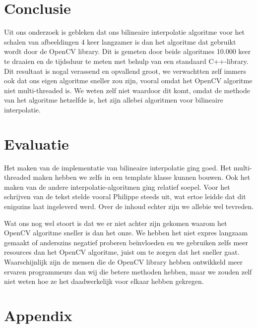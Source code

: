 \documentclass[a4paper]{article}
\begin{document}
\section{Conclusie}
\label{sec:org155c025}
Uit ons onderzoek is gebleken dat ons bilineaire interpolatie algoritme voor het schalen van afbeeldingen 4 keer langzamer is dan het algoritme dat gebruikt wordt door de OpenCV library. Dit is gemeten door beide algoritmes 10.000 keer te draaien en de tijdsduur te meten met behulp van een standaard C++-library. Dit resultaat is nogal verassend en opvallend groot, we verwachtten zelf immers ook dat ons eigen algoritme sneller zou zijn, vooral omdat het OpenCV algoritme niet multi-threaded is. We weten zelf niet waardoor dit komt, omdat de methode van het algoritme hetzelfde is, het zijn allebei algoritmen voor bilineaire interpolatie.

\section{Evaluatie}
\label{sec:orge75f9e9}
Het maken van de implementatie van bilineaire interpolatie ging goed. Het multi-threaded maken hebben we zelfs in een template klasse kunnen bouwen. Ook het maken van de andere interpolatie-algoritmen ging relatief soepel. Voor het schrijven van de tekst stelde vooral Philippe steeds uit, wat ertoe leidde dat dit enigszins laat ingeleverd werd. Over de inhoud echter zijn we allebie wel tevreden. 

Wat ons nog wel stoort is dat we er niet achter zijn gekomen waarom het OpenCV algoritme sneller is dan het onze. We hebben het niet expres langzaam gemaakt of anderszins negatief proberen beïnvloeden en we gebruiken zelfs meer resources dan het OpenCV algoritme, juist om te zorgen dat het sneller gaat. Waarschijnlijk zijn de mensen die de OpenCV library hebben ontwikkeld meer ervaren programmeurs dan wij die betere methoden hebben, maar we zouden zelf niet weten hoe ze het daadwerkelijk voor elkaar hebben gekregen. 

\section{Appendix}
\label{sec:orgcd07ec2}
\end{document}

